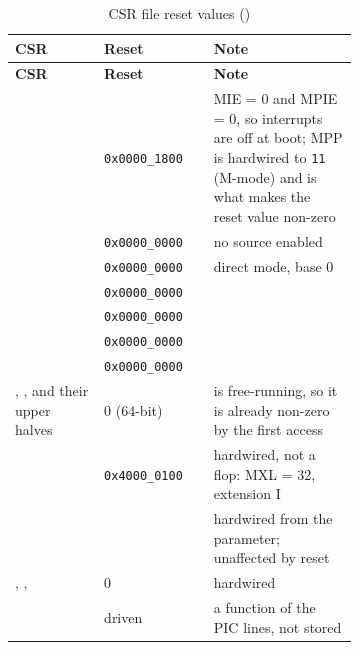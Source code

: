 {\small
\begin{longtable}{@{}L{0.26\linewidth}lL{0.42\linewidth}@{}}
\caption{CSR file reset values ()}
\label{tab:csrreset}\\
\toprule
\textbf{CSR} & \textbf{Reset} & \textbf{Note} \\
\midrule
\endfirsthead
\toprule
\textbf{CSR} & \textbf{Reset} & \textbf{Note} \\
\midrule
\endhead
\bottomrule
\endfoot
\bottomrule
\endlastfoot
{}   & \texttt{0x0000\_1800} & MIE = 0 and MPIE = 0, so interrupts are
  off at boot; MPP is hardwired to \texttt{11} (M-mode) and is what makes the
  reset value non-zero \\
       & \texttt{0x0000\_0000} & no source enabled \\
     & \texttt{0x0000\_0000} & direct mode, base 0 \\
  & \texttt{0x0000\_0000} & \\
      & \texttt{0x0000\_0000} & \\
    & \texttt{0x0000\_0000} & \\
     & \texttt{0x0000\_0000} & \\
, ,  and their upper halves
                & 0 (64-bit) &  is free-running, so it is already
  non-zero by the first access \\
\midrule
{}      & \texttt{0x4000\_0100} & hardwired, not a flop: MXL = 32,
  extension I \\
   &  & hardwired from the parameter; unaffected by
  reset \\
, ,  & 0 & hardwired \\
       & driven & a function of the PIC lines, not stored \\
\end{longtable}}

